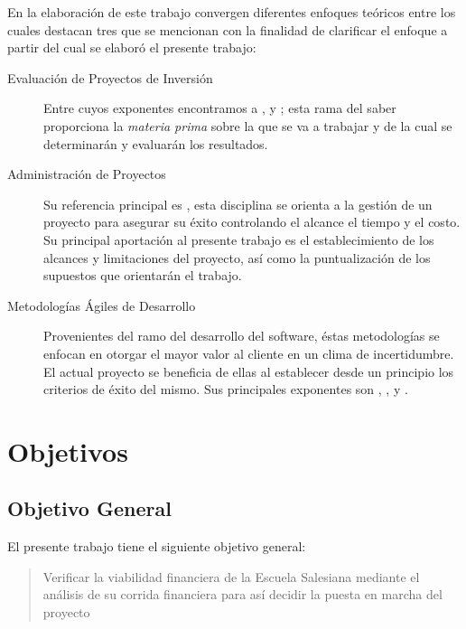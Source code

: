 En la elaboración de este trabajo convergen diferentes enfoques teóricos entre los cuales destacan tres que se mencionan con la finalidad de clarificar el enfoque a partir del cual se elaboró el presente trabajo:

\begin{description}
    \item[Evaluación de Proyectos de Inversión] Entre cuyos exponentes encontramos a \citep{SAPAG2007}, \citep{COSS2000} y \citep{Leland2006}; esta rama del saber proporciona la \emph{materia prima} sobre la que se va a trabajar y de la cual se determinarán y evaluarán los resultados.
    \item[Administración de Proyectos] Su referencia principal es \citep{PMBOK2008}, esta disciplina se orienta a la gestión de un proyecto para asegurar su éxito controlando el alcance el tiempo y el costo. Su principal aportación al presente trabajo es el establecimiento de los alcances y limitaciones del proyecto, así como la puntualización de los supuestos que orientarán el trabajo.
    \item[Metodologías Ágiles de Desarrollo] Provenientes del ramo del desarrollo del software, éstas metodologías se enfocan en otorgar el mayor valor al cliente en un clima de incertidumbre. El actual proyecto se beneficia de ellas al establecer desde un principio los criterios de éxito del mismo. Sus principales exponentes son \citep{AgileManifesto2001}, \citep{Wells2009}, \citep{Scrum2010} y \citep{Poppendieck2001}.
\end{description}

\section{Objetivos}

\subsection{Objetivo General}
\label{sub:ObjetivoGeneral}

El presente trabajo tiene el siguiente objetivo general:

\begin{quotation}
	Verificar la viabilidad financiera de la Escuela Salesiana mediante el análisis de su corrida financiera para así decidir la puesta en marcha del proyecto
\end{quotation}

